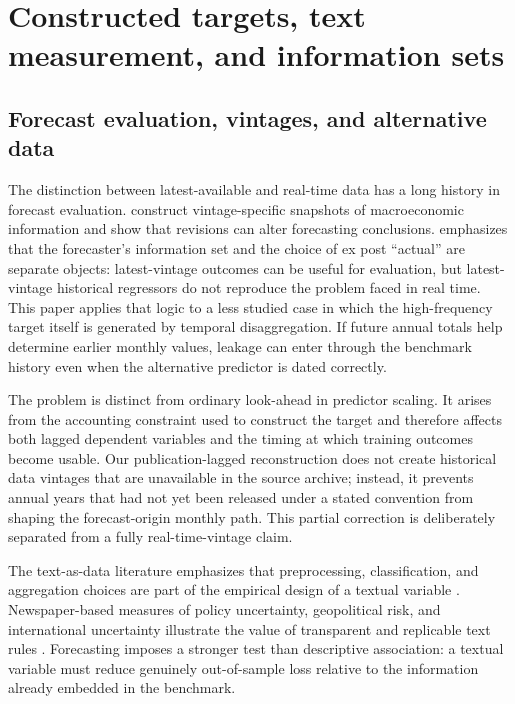 \documentclass[preprint,12pt,authoryear]{elsarticle}
\begin{document}
\section{Constructed targets, text measurement, and information sets}
\subsection{Forecast evaluation, vintages, and alternative data}
The distinction between latest-available and real-time data has a long history in forecast evaluation. \citet{croushorestark2001} construct vintage-specific snapshots of macroeconomic information and show that revisions can alter forecasting conclusions. \citet{croushore2006} emphasizes that the forecaster's information set and the choice of ex post ``actual'' are separate objects: latest-vintage outcomes can be useful for evaluation, but latest-vintage historical regressors do not reproduce the problem faced in real time. This paper applies that logic to a less studied case in which the high-frequency target itself is generated by temporal disaggregation. If future annual totals help determine earlier monthly values, leakage can enter through the benchmark history even when the alternative predictor is dated correctly.

The problem is distinct from ordinary look-ahead in predictor scaling. It arises from the accounting constraint used to construct the target and therefore affects both lagged dependent variables and the timing at which training outcomes become usable. Our publication-lagged reconstruction does not create historical data vintages that are unavailable in the source archive; instead, it prevents annual years that had not yet been released under a stated convention from shaping the forecast-origin monthly path. This partial correction is deliberately separated from a fully real-time-vintage claim.

The text-as-data literature emphasizes that preprocessing, classification, and aggregation choices are part of the empirical design of a textual variable \citep{gentzkow2019}. Newspaper-based measures of policy uncertainty, geopolitical risk, and international uncertainty illustrate the value of transparent and replicable text rules \citep{baker2016,caldara2022,ahir2022}. Forecasting imposes a stronger test than descriptive association: a textual variable must reduce genuinely out-of-sample loss relative to the information already embedded in the benchmark.
\end{document}
